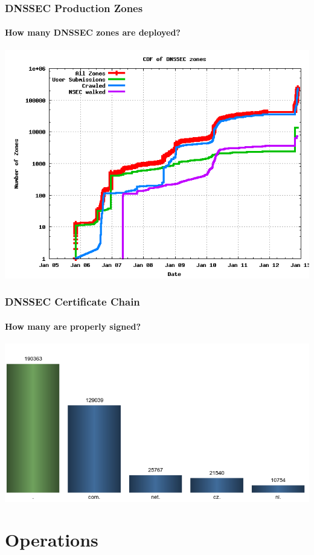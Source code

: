 \documentclass{beamer}
\begin{document}
\begin{frame}
  \frametitle{DNSSEC Production Zones}
  \framesubtitle{How many DNSSEC zones are deployed?}
  \includegraphics[width=.9\textwidth]{dnssec-growth}
\end{frame}

\begin{frame}
  \frametitle{DNSSEC Certificate Chain}
  \framesubtitle{How many are properly signed?}
  \includegraphics[width=\textwidth]{dnssec-on-tlds}

\end{frame}

\section{Operations}
\end{document}
